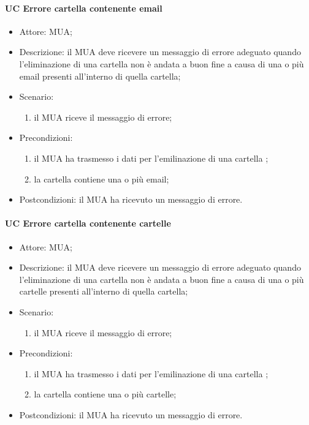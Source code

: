     \paragraph{UC Errore cartella contenente email} \label{sec: UC 11.4.2.1}
    \begin{itemize}
        \item Attore: MUA;
        \item Descrizione: il MUA deve ricevere un messaggio di errore adeguato quando l'eliminazione di una cartella non è andata a buon fine a causa di una o più email presenti all'interno di quella cartella;
        \item Scenario:
        \begin{enumerate}
        \item il MUA riceve il messaggio di errore;
        \end{enumerate}   
        \item Precondizioni: 
        \begin{enumerate}
            \item il MUA ha trasmesso i dati per l'emilinazione di una cartella ;
            \item la cartella contiene una o più email;
        \end{enumerate}
        \item Postcondizioni: il MUA ha ricevuto un messaggio di errore.
    \end{itemize}

        \paragraph{UC Errore cartella contenente cartelle} \label{sec: UC 11.4.2.1}
        \begin{itemize}
            \item Attore: MUA;
            \item Descrizione: il MUA deve ricevere un messaggio di errore adeguato quando l'eliminazione di una cartella non è andata a buon fine a causa di una o più cartelle presenti all'interno di quella cartella;
            \item Scenario:
            \begin{enumerate}
            \item il MUA riceve il messaggio di errore;
            \end{enumerate}   
            \item Precondizioni: 
            \begin{enumerate}
                \item il MUA ha trasmesso i dati per l'emilinazione di una cartella ;
                \item la cartella contiene una o più cartelle;
            \end{enumerate}
            \item Postcondizioni: il MUA ha ricevuto un messaggio di errore.
        \end{itemize}
    


